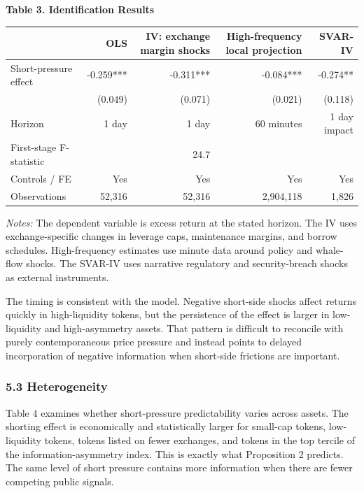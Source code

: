 \documentclass[
]{article}
\newcounter{none} %
\begin{document}
\textbf{Table 3. Identification Results}

{\def\LTcaptype{none} %
\begin{longtable}[]{@{}lrrrr@{}}
\toprule\noalign{}
& OLS & IV: exchange margin shocks & High-frequency local projection &
SVAR-IV \\
\midrule\noalign{}
\endhead
\bottomrule\noalign{}
\endlastfoot
Short-pressure effect & -0.259*** & -0.311*** & -0.084*** & -0.274** \\
& (0.049) & (0.071) & (0.021) & (0.118) \\
Horizon & 1 day & 1 day & 60 minutes & 1 day impact \\
First-stage F-statistic & & 24.7 & & \\
Controls / FE & Yes & Yes & Yes & Yes \\
Observations & 52,316 & 52,316 & 2,904,118 & 1,826 \\
\end{longtable}
}

\emph{Notes:} The dependent variable is excess return at the stated
horizon. The IV uses exchange-specific changes in leverage caps,
maintenance margins, and borrow schedules. High-frequency estimates use
minute data around policy and whale-flow shocks. The SVAR-IV uses
narrative regulatory and security-breach shocks as external instruments.

The timing is consistent with the model. Negative short-side shocks
affect returns quickly in high-liquidity tokens, but the persistence of
the effect is larger in low-liquidity and high-asymmetry assets. That
pattern is difficult to reconcile with purely contemporaneous price
pressure and instead points to delayed incorporation of negative
information when short-side frictions are important.

\subsubsection{5.3 Heterogeneity}\label{53-heterogeneity}

Table 4 examines whether short-pressure predictability varies across
assets. The shorting effect is economically and statistically larger for
small-cap tokens, low-liquidity tokens, tokens listed on fewer
exchanges, and tokens in the top tercile of the information-asymmetry
index. This is exactly what Proposition 2 predicts. The same level of
short pressure contains more information when there are fewer competing
public signals.
\end{document}
